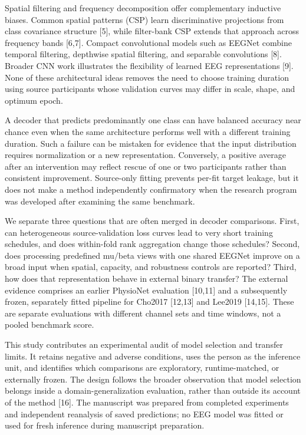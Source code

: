 \documentclass[11pt]{article}
\begin{document}
Spatial filtering and frequency decomposition offer complementary inductive biases. Common spatial patterns (CSP) learn discriminative projections from class covariance structure [5], while filter-bank CSP extends that approach across frequency bands [6,7]. Compact convolutional models such as EEGNet combine temporal filtering, depthwise spatial filtering, and separable convolutions [8]. Broader CNN work illustrates the flexibility of learned EEG representations [9]. None of these architectural ideas removes the need to choose training duration using source participants whose validation curves may differ in scale, shape, and optimum epoch.

A decoder that predicts predominantly one class can have balanced accuracy near chance even when the same architecture performs well with a different training duration. Such a failure can be mistaken for evidence that the input distribution requires normalization or a new representation. Conversely, a positive average after an intervention may reflect rescue of one or two participants rather than consistent improvement. Source-only fitting prevents per-fit target leakage, but it does not make a method independently confirmatory when the research program was developed after examining the same benchmark.

We separate three questions that are often merged in decoder comparisons. First, can heterogeneous source-validation loss curves lead to very short training schedules, and does within-fold rank aggregation change those schedules? Second, does processing predefined mu/beta views with one shared EEGNet improve on a broad input when spatial, capacity, and robustness controls are reported? Third, how does that representation behave in external binary transfer? The external evidence comprises an earlier PhysioNet evaluation [10,11] and a subsequently frozen, separately fitted pipeline for Cho2017 [12,13] and Lee2019 [14,15]. These are separate evaluations with different channel sets and time windows, not a pooled benchmark score.

This study contributes an experimental audit of model selection and transfer limits. It retains negative and adverse conditions, uses the person as the inference unit, and identifies which comparisons are exploratory, runtime-matched, or externally frozen. The design follows the broader observation that model selection belongs inside a domain-generalization evaluation, rather than outside its account of the method [16]. The manuscript was prepared from completed experiments and independent reanalysis of saved predictions; no EEG model was fitted or used for fresh inference during manuscript preparation.
\end{document}
